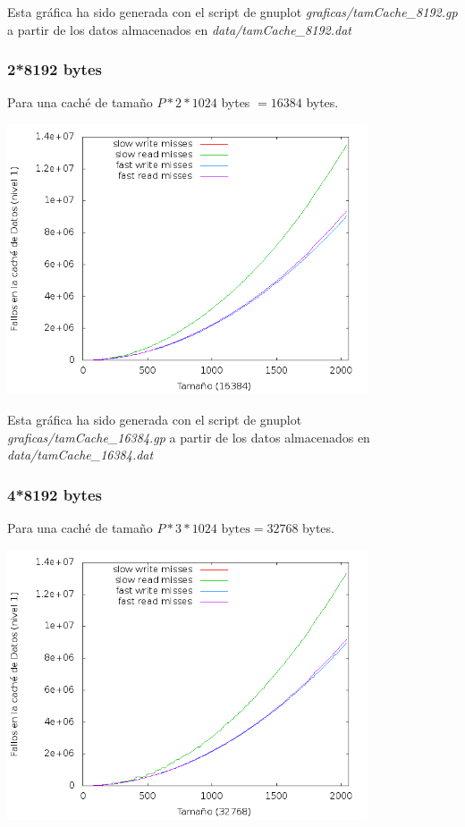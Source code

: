 \documentclass[nochap]{apuntes}
\begin{document}
Esta gráfica ha sido generada con el script de gnuplot \emph{graficas/tamCache\_8192.gp} a partir de los datos almacenados en \emph{data/tamCache\_8192.dat}
\subsubsection*{2*8192 bytes}
Para una caché de tamaño $P*2*1024$ bytes $= 16384 $ bytes.

\begin{center}
\includegraphics[width=0.8\textwidth]{graficas/fotos/Cache_16384.png}
\end{center}

Esta gráfica ha sido generada con el script de gnuplot \emph{graficas/tamCache\_16384.gp} a partir de los datos almacenados en \emph{data/tamCache\_16384.dat}

\subsubsection*{4*8192 bytes}

Para una caché de tamaño $P*3*1024\text{ bytes} = 32768 $ bytes.
\begin{center}
\includegraphics[width=0.8\textwidth]{graficas/fotos/Cache_32768.png}
\end{center}
\end{document}

